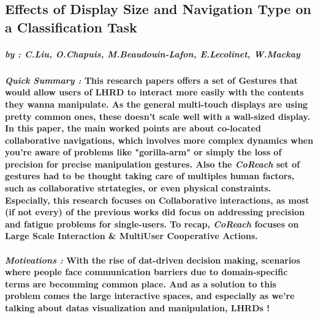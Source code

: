\subsection*{Effects of Display Size and Navigation Type on a Classification Task}
    \subparagraph{by : C.Liu, O.Chapuis, M.Beaudouin-Lafon, E.Lecolinet, W.Mackay}
    \cite{liu2017CoReach}
    \paragraph{ \textit{Quick Summary :} 
                \newline
                \indent \indent \textnormal{This research papers offers a set of Gestures that would allow users of LHRD to interact more
                easily with the contents they wanna manipulate. As the general multi-touch displays are using pretty common ones, these doesn't 
                scale well with a wall-sized display.}
                \newline
                \indent \indent \textnormal{In this paper, the main worked points are about co-located collaborative navigations, which involves
                more complex dynamics when you're aware of problems like "gorilla-arm" or simply the loss of precision for precise manipulation gestures. 
                Also the \textit{CoReach} set of gestures had to be thought taking care of multiples human factors, such as collaborative strtategies, 
                or even physical constraints.}
                \newline
                \indent \indent \textnormal{Especially, this research focuses on Collaborative interactions, as most (if not every) of the previous works
                did focus on addressing precision and fatigue problems for single-users. To recap, \textit{CoReach} focuses on Large Scale Interaction \& 
                MultiUser Cooperative Actions.} }
    
    \paragraph{ \textit{Motivations :} 
                \newline
                \indent \indent \textnormal{With the rise of dat-driven decision making, scenarios where people face communication barriers due to domain-specific 
                terms are becomming common place. And as a solution to this problem comes the large interactive spaces, and especially as we're talking about datas 
                visualization and manipulation, LHRDs !} }

